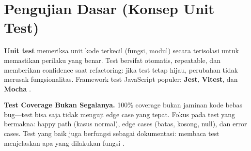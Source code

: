 \section{Pengujian Dasar (Konsep Unit Test)}

\textbf{Unit test} memeriksa unit kode terkecil (fungsi, modul) secara terisolasi untuk memastikan perilaku yang benar. Test bersifat otomatis, repeatable, dan memberikan confidence saat refactoring: jika test tetap hijau, perubahan tidak merusak fungsionalitas. Framework test JavaScript populer: \textbf{Jest}, \textbf{Vitest}, dan \textbf{Mocha} \cite{mdnToolsTesting}.


\begin{catatan}
{\sloppy
\textbf{Test Coverage Bukan Segalanya.} 100\% coverage bukan jaminan kode bebas bug---test bisa saja tidak menguji edge case yang tepat. Fokus pada test yang bermakna: happy path (kasus normal), edge cases (batas, kosong, null), dan error cases. Test yang baik juga berfungsi sebagai dokumentasi: membaca test menjelaskan apa yang dilakukan fungsi \cite{mdnToolsTesting}.
\par}
\end{catatan}

